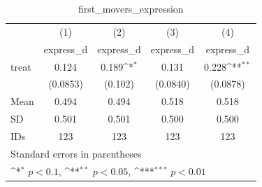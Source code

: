 \begin{table}[htbp]\centering
\def\sym#1{\ifmmode^{#1}\else\(^{#1}\)\fi}
\caption{first\_movers\_expression}
\begin{tabular}{l*{4}{c}}
\hline\hline
                                &\multicolumn{1}{c}{(1)}&\multicolumn{1}{c}{(2)}&\multicolumn{1}{c}{(3)}&\multicolumn{1}{c}{(4)}\\
                                &\multicolumn{1}{c}{express\_d}&\multicolumn{1}{c}{express\_d}&\multicolumn{1}{c}{express\_d}&\multicolumn{1}{c}{express\_d}\\
\hline
treat                           &    0.124         &    0.189\sym{*}  &    0.131         &    0.228\sym{**} \\
                                & (0.0853)         &  (0.102)         & (0.0840)         & (0.0878)         \\
\hline
Mean                            &    0.494         &    0.494         &    0.518         &    0.518         \\
SD                              &    0.501         &    0.501         &    0.500         &    0.500         \\
IDs                             &      123         &      123         &      123         &      123         \\
\hline\hline
\multicolumn{5}{l}{\footnotesize Standard errors in parentheses}\\
\multicolumn{5}{l}{\footnotesize \sym{*} \(p<0.1\), \sym{**} \(p<0.05\), \sym{***} \(p<0.01\)}\\
\end{tabular}
\end{table}
